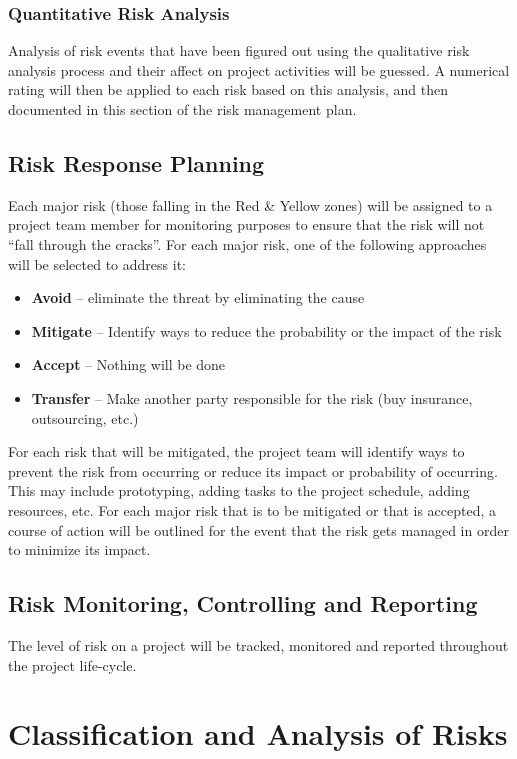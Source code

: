 \documentclass{article}
\begin{document}
\subsubsection{Quantitative Risk Analysis}
Analysis of risk events that have been figured out using the qualitative risk analysis process and their affect on project activities will be guessed. A numerical rating will then be applied to each risk based on this analysis, and then documented in this section of the risk management plan.

\subsection{Risk Response Planning}
Each major risk (those falling in the Red & Yellow zones) will be assigned to a project team member for monitoring purposes to ensure that the risk will not “fall through the cracks”.  
For each major risk, one of the following approaches will be selected to address it:
\begin{itemize}
    \item \textbf{Avoid} – eliminate the threat by eliminating the cause
    \item \textbf{Mitigate} – Identify ways to reduce the probability or the impact of the risk
    \item \textbf{Accept} – Nothing will be done 
    \item \textbf{Transfer} – Make another party responsible for the risk (buy insurance, outsourcing, etc.)
\end{itemize}

For each risk that will be mitigated, the project team will identify ways to prevent the risk from occurring or reduce its impact or probability of occurring.  This may include prototyping, adding tasks to the project schedule, adding resources, etc.
For each major risk that is to be mitigated or that is accepted, a course of action will be outlined for the event that the risk gets managed in order to minimize its impact.
\subsection{Risk Monitoring, Controlling and Reporting}
The level of risk on a project will be tracked, monitored and reported throughout the project life-cycle.  
\section{Classification and Analysis of Risks}
\end{document}
